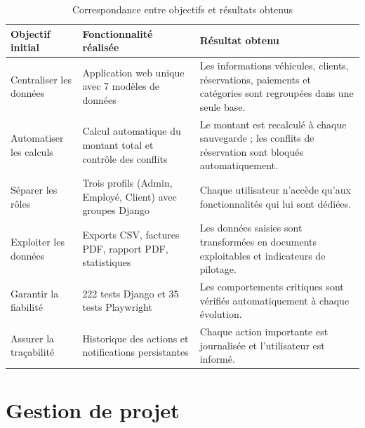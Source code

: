 \begin{table}[H]
\centering
\caption{Correspondance entre objectifs et résultats obtenus}
\begin{tabularx}{\textwidth}{|X|X|X|}
\hline
\textbf{Objectif initial} & \textbf{Fonctionnalité réalisée} & \textbf{Résultat obtenu} \\
\hline
Centraliser les données & Application web unique avec 7 modèles de données & Les informations véhicules, clients, réservations, paiements et catégories sont regroupées dans une seule base. \\
\hline
Automatiser les calculs & Calcul automatique du montant total et contrôle des conflits & Le montant est recalculé à chaque sauvegarde ; les conflits de réservation sont bloqués automatiquement. \\
\hline
Séparer les rôles & Trois profils (Admin, Employé, Client) avec groupes Django & Chaque utilisateur n'accède qu'aux fonctionnalités qui lui sont dédiées. \\
\hline
Exploiter les données & Exports CSV, factures PDF, rapport PDF, statistiques & Les données saisies sont transformées en documents exploitables et indicateurs de pilotage. \\
\hline
Garantir la fiabilité & 222 tests Django et 35 tests Playwright & Les comportements critiques sont vérifiés automatiquement à chaque évolution. \\
\hline
Assurer la traçabilité & Historique des actions et notifications persistantes & Chaque action importante est journalisée et l'utilisateur est informé. \\
\hline
\end{tabularx}
\end{table}

\section{Gestion de projet}

